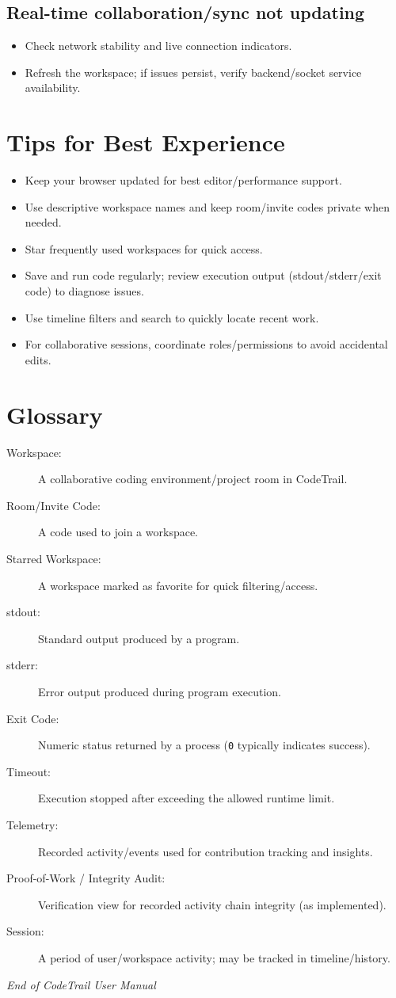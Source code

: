 \documentclass[11pt,a4paper]{article}
\begin{document}
\subsection{Real-time collaboration/sync not updating}
\begin{itemize}
  \item Check network stability and live connection indicators.
  \item Refresh the workspace; if issues persist, verify backend/socket service availability.
\end{itemize}

\section{Tips for Best Experience}
\begin{itemize}
  \item Keep your browser updated for best editor/performance support.
  \item Use descriptive workspace names and keep room/invite codes private when needed.
  \item Star frequently used workspaces for quick access.
  \item Save and run code regularly; review execution output (stdout/stderr/exit code) to diagnose issues.
  \item Use timeline filters and search to quickly locate recent work.
  \item For collaborative sessions, coordinate roles/permissions to avoid accidental edits.
\end{itemize}

\section{Glossary}
\begin{description}
  \item[Workspace:] A collaborative coding environment/project room in CodeTrail.
  \item[Room/Invite Code:] A code used to join a workspace.
  \item[Starred Workspace:] A workspace marked as favorite for quick filtering/access.
  \item[stdout:] Standard output produced by a program.
  \item[stderr:] Error output produced during program execution.
  \item[Exit Code:] Numeric status returned by a process (\texttt{0} typically indicates success).
  \item[Timeout:] Execution stopped after exceeding the allowed runtime limit.
  \item[Telemetry:] Recorded activity/events used for contribution tracking and insights.
  \item[Proof-of-Work / Integrity Audit:] Verification view for recorded activity chain integrity (as implemented).
  \item[Session:] A period of user/workspace activity; may be tracked in timeline/history.
\end{description}

\begin{center}
\textit{End of CodeTrail User Manual}
\end{center}
\end{document}
